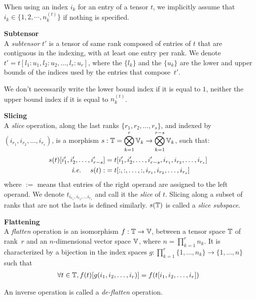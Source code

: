 \begin{remark}
When using an index $i_k$ for an entry of a tensor $t$, we implicitly assume that $i_k \in \{1, 2, \cdots, n_k^{(t)}\}$ if nothing is specified.
\end{remark}

\begin{definition}\textbf{Subtensor}\\
A \emph{subtensor} $t'$ is a tensor of same rank composed of entries of $t$ that are contiguous in the indexing, with at least one entry per rank. We denote $t' = t[l_1{:}u_1, l_2{:}u_2, \ldots, l_r{:}u_r]$, where the $\{l_k\}$ and the $\{u_k\}$ are the lower and upper bounds of the indices used by the entries that compose~$t'$.
\end{definition}

\begin{remark}
We don't necessarily write the lower bound index if it is equal to $1$, neither the upper bound index if it is equal to $n_k^{(t)}$.
\end{remark}


\begin{definition}\textbf{Slicing}\\
A \emph{slice} operation, along the last ranks $\{r_1, r_2, \ldots, r_s\}$, and indexed by $(i_{r_1}, i_{r_2}, \ldots, i_{r_s})$, is a morphism $s: \mathbb{T} = \displaystyle \bigotimes_{k=1}^r \mathbb{V}_k \rightarrow \displaystyle \bigotimes_{k=1}^{r-s} \mathbb{V}_k$, such that:
\begin{align*}
s(t)[i'_1, i'_2, \ldots, i'_{r-s}] &= t[i'_1, i'_2, \ldots, i'_{r-s}, i_{r_1}, i_{r_2}, \ldots, i_{r_s}] \\
\text{ \emph{i.e.}~} \quad s(t) :&= t[:,:, \ldots, :, i_{r_1}, i_{r_2}, \ldots, i_{r_s}]
\end{align*}
where $:=$ means that entries of the right operand are assigned to the left operand.
We denote $t_{i_{r_1}, i_{r_2}, \ldots i_{r_s}}$ and call it the \emph{slice} of $t$. 
Slicing along a subset of ranks that are not the lasts is defined similarly.
$s(\mathbb{T})$ is called a \emph{slice subspace}.
\end{definition}

\begin{definition}\textbf{Flattening}\\
A \emph{flatten} operation is an isomorphism $f: \mathbb{T} \rightarrow \mathbb{V}$, between a tensor space $\mathbb{T}$ of rank~$r$ and an $n$-dimensional vector space $\mathbb{V}$, where $n =\displaystyle \prod_{k=1}^r n_k$. It is characterized by a bijection in the index spaces $g: \displaystyle \prod_{k=1}^r \{1, \ldots, n_k \} \rightarrow\{1, \ldots, n \}$ such that
\begin{gather*}
  \forall t \in \mathbb{T}, f(t)[g(i_1, i_2, \ldots, i_r)] = f(t[i_1, i_2, \ldots, i_r])
\end{gather*}

An inverse operation is called a \emph{de-flatten} operation.
\end{definition}

